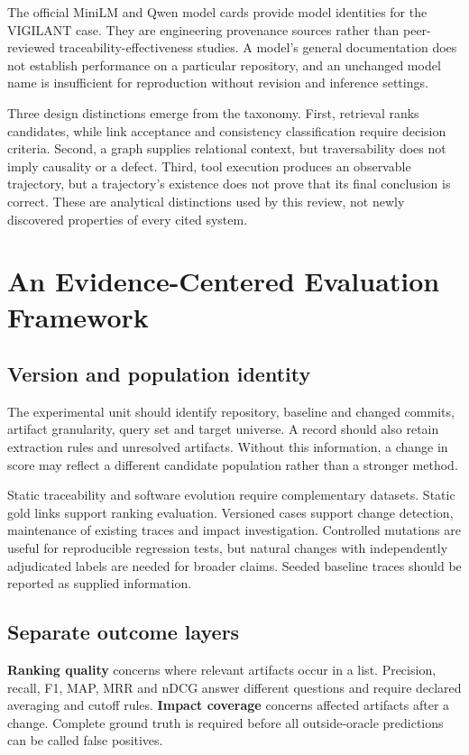 \documentclass[conference,a4paper]{IEEEtran}
\begin{document}
The official MiniLM and Qwen model cards \cite{minilm,qwen} provide model identities for the VIGILANT case. They are engineering provenance sources rather than peer-reviewed traceability-effectiveness studies. A model's general documentation does not establish performance on a particular repository, and an unchanged model name is insufficient for reproduction without revision and inference settings.

Three design distinctions emerge from the taxonomy. First, retrieval ranks candidates, while link acceptance and consistency classification require decision criteria. Second, a graph supplies relational context, but traversability does not imply causality or a defect. Third, tool execution produces an observable trajectory, but a trajectory's existence does not prove that its final conclusion is correct. These are analytical distinctions used by this review, not newly discovered properties of every cited system.

\section{An Evidence-Centered Evaluation Framework}
\subsection{Version and population identity}
The experimental unit should identify repository, baseline and changed commits, artifact granularity, query set and target universe. A record should also retain extraction rules and unresolved artifacts. Without this information, a change in score may reflect a different candidate population rather than a stronger method.

Static traceability and software evolution require complementary datasets. Static gold links support ranking evaluation. Versioned cases support change detection, maintenance of existing traces and impact investigation. Controlled mutations are useful for reproducible regression tests, but natural changes with independently adjudicated labels are needed for broader claims. Seeded baseline traces should be reported as supplied information.

\subsection{Separate outcome layers}
\textbf{Ranking quality} concerns where relevant artifacts occur in a list. Precision, recall, F1, MAP, MRR and nDCG answer different questions and require declared averaging and cutoff rules. \textbf{Impact coverage} concerns affected artifacts after a change. Complete ground truth is required before all outside-oracle predictions can be called false positives.
\end{document}
